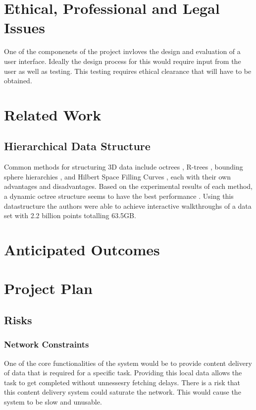 \documentclass[12pt,a4paper]{article}
\begin{document}
\section{Ethical, Professional and Legal Issues}
One of the componenets of the project invloves the design and evaluation
of a user interface. Ideally the design process for this would require
input from the user as well as testing. This testing requires ethical clearance
that will have to be obtained.


\section{Related Work}
\subsection{Hierarchical Data Structure}
Common methods for structuring 3D data include octrees \cite{interactivepointclouds}, R-trees \cite{rtree}, bounding sphere hierarchies \cite{qsplat}, and Hilbert Space Filling Curves \cite{hilbert}, each with their own advantages and disadvantages. Based on the experimental results of each method, a dynamic octree structure seems to have the best performance \cite{interactivepointclouds}. Using this datastructure the authors were able to achieve interactive walkthroughs of a data set with 2.2 billion points totalling 63.5GB.

\section{Anticipated Outcomes}

\section{Project Plan}
\subsection{Risks}
\subsubsection*{Network Constraints}
One of the core functionalities of the system would be to provide
content delivery of data that is required for a specific task. Providing
this local data allows the task to get completed without unnessesry
fetching delays. There is a risk that this content delivery system
could saturate the network. This would cause the system to be slow
and unusable.
\end{document}
